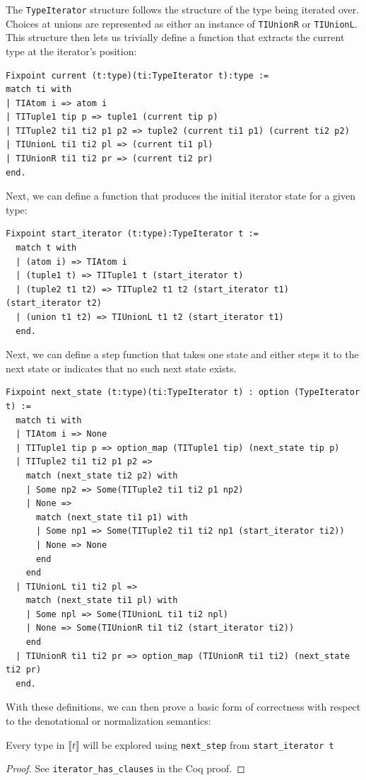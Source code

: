 \documentclass[a4paper,english]{lipics-v2018}
\newcommand{\denotes}[1]{\llbracket #1 \rrbracket}
\begin{document}
The \verb|TypeIterator| structure follows the structure of the type being
iterated over. Choices at unions are represented as either an instance of
\verb|TIUnionR| or \verb|TIUnionL|. This structure then lets us trivially
define a function that extracts the current type at the iterator's position:

\begin{verbatim}
Fixpoint current (t:type)(ti:TypeIterator t):type :=
match ti with
| TIAtom i => atom i
| TITuple1 tip p => tuple1 (current tip p)
| TITuple2 ti1 ti2 p1 p2 => tuple2 (current ti1 p1) (current ti2 p2)
| TIUnionL ti1 ti2 pl => (current ti1 pl)
| TIUnionR ti1 ti2 pr => (current ti2 pr)
end.
\end{verbatim}

Next, we can define a function that produces the initial iterator state for a
given type:

\begin{verbatim}
Fixpoint start_iterator (t:type):TypeIterator t :=
  match t with
  | (atom i) => TIAtom i
  | (tuple1 t) => TITuple1 t (start_iterator t)
  | (tuple2 t1 t2) => TITuple2 t1 t2 (start_iterator t1) (start_iterator t2)
  | (union t1 t2) => TIUnionL t1 t2 (start_iterator t1)
  end.
\end{verbatim}

Next, we can define a step function that takes one state and either steps it
to the next state or indicates that no such next state exists.

\begin{verbatim}
Fixpoint next_state (t:type)(ti:TypeIterator t) : option (TypeIterator t) :=
  match ti with
  | TIAtom i => None
  | TITuple1 tip p => option_map (TITuple1 tip) (next_state tip p)
  | TITuple2 ti1 ti2 p1 p2 =>
    match (next_state ti2 p2) with
    | Some np2 => Some(TITuple2 ti1 ti2 p1 np2)
    | None =>
      match (next_state ti1 p1) with
      | Some np1 => Some(TITuple2 ti1 ti2 np1 (start_iterator ti2))
      | None => None
      end
    end
  | TIUnionL ti1 ti2 pl =>
    match (next_state ti1 pl) with
    | Some npl => Some(TIUnionL ti1 ti2 npl)
    | None => Some(TIUnionR ti1 ti2 (start_iterator ti2))
    end
  | TIUnionR ti1 ti2 pr => option_map (TIUnionR ti1 ti2) (next_state ti2 pr)
  end.
\end{verbatim}

With these definitions, we can then prove a basic form of correctness with
respect to the denotational or normalization semantics:

\begin{theorem}
Every type in $\denotes{t}$ will be explored using \verb|next_step| from \verb|start_iterator t| 
\end{theorem}
\begin{proof}
See \verb|iterator_has_clauses| in the Coq proof.
\end{proof}
\end{document}
